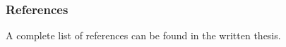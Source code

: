 \documentclass{beamer}
\begin{document}
\begin{frame}[t,allowframebreaks]
	\frametitle{References}
	A complete list of references can be found in the written thesis.

	\printbibliography

\end{frame}





\appendix
{}
\setcounter{finalframe}{\value{framenumber}}

\begin{frame}
\end{frame}
\end{document}
